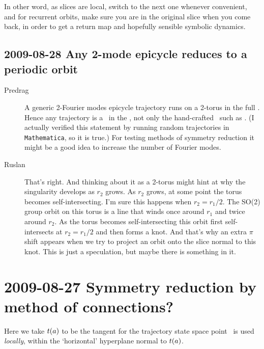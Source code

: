 In other word, as slices are local, switch to the next one whenever
convenient, and for recurrent orbits, make sure you are in the original
slice when you come back, in order to get a return map and hopefully sensible
symbolic dynamics.

\subsection{2009-08-28 Any 2-mode epicycle reduces to a periodic orbit}

\begin{description}
\item[Predrag]
A generic 2-Fourier modes epicycle trajectory runs on a 2-torus in the
full \statesp. Hence any trajectory is a \po\ in the \reducedsp, not
only the hand-crafted \rpo\ such as .
(I actually verified this statement by running random trajectories
in \texttt{Mathematica}, so it is true.)
For testing methods of symmetry reduction
it might be a good idea to increase the number of Fourier modes.
\item[Ruslan]
That's right.  And thinking about it
as a 2-torus might hint at why the singularity develops as
$r_2$ grows. As $r_2$ grows, at some point the torus becomes
self-intersecting. I'm sure this happens when $r_2 = r_1/2$.
The SO(2) group orbit on this torus is a line that winds once
around $r_1$ and twice around $r_2$.  As the torus becomes
self-intersecting this orbit first self-intersects at $r_2 =
r_1/2$ and then forms a knot.  And that's why an extra $\pi$
shift appears when we try to project an orbit onto the slice
normal to this knot.  This is just a speculation, but maybe
there is something in it.
\end{description}

\section{2009-08-27 Symmetry reduction by method of connections?}

Here we take $t(a)$ to
be the tangent for the trajectory state space point \ssp\ is
used \emph{locally}, within the `horizontal' hyperplane
normal to $t(a)$.

